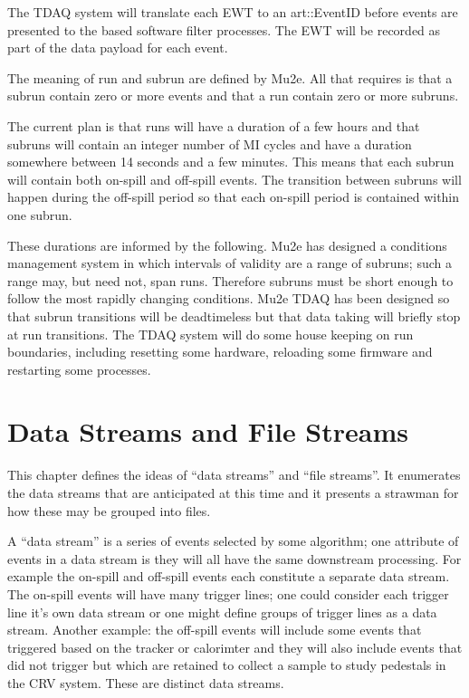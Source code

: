The TDAQ system will translate each EWT to an {\code art::EventID}
before events are presented to the \art based software filter processes.
The EWT will be recorded as part of the data payload for each event.

The meaning of run and subrun are defined by Mu2e.
All that \art requires is that a subrun contain zero or more
events and that a run contain zero or more subruns.

The current plan is that runs will have a duration of a few hours
and that subruns will contain an integer number of MI cycles and
have a duration somewhere between 14 seconds and a few minutes.
This means that each subrun will contain both on-spill and
off-spill events.   The transition between subruns will
happen during the off-spill period so that each on-spill
period is contained within one subrun.

These durations are informed by the following.
Mu2e has designed a conditions management system
in which intervals of validity are a range of subruns;
such a range may, but need not, span runs.
Therefore subruns must be short enough to follow the most
rapidly changing conditions.
Mu2e TDAQ has been designed so that subrun transitions will be
deadtimeless but that data taking will briefly stop at run
transitions.  The TDAQ system will do some house keeping
on run boundaries, including resetting some hardware, reloading
some firmware and restarting some processes.

\chapter{Data Streams and File Streams}

This chapter defines the ideas of ``data streams'' and ``file streams''.
It enumerates the data streams that are anticipated at this time
and it presents a strawman for how these may be grouped into files.


A ``data stream'' is a series of events selected by some algorithm;
one attribute of events in a data stream is they will all have the same downstream processing.
For example the on-spill and off-spill events each constitute a separate data stream.
The on-spill events will have many trigger lines; one could consider each trigger
line it's own data stream or one might define groups of trigger lines as a data stream.
Another example: the off-spill events will include some events that triggered based on
the tracker or calorimter and they will also include events that did not trigger but
which are retained to collect a sample to study pedestals in the CRV system.
These are distinct data streams.

